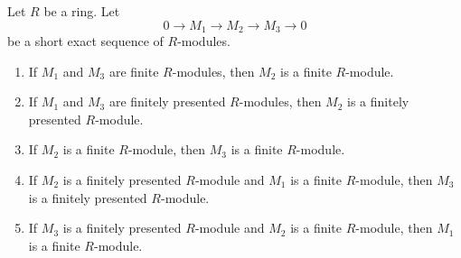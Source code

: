 \begin{lemma}
\label{lemma-extension}
Let $R$ be a ring.
Let
$$
0 \to M_1 \to M_2 \to M_3 \to 0
$$
be a short exact sequence of $R$-modules.
\begin{enumerate}
\item If $M_1$ and $M_3$ are finite $R$-modules, then $M_2$ is a finite
$R$-module.
\item If $M_1$ and $M_3$ are finitely presented $R$-modules, then $M_2$
is a finitely presented $R$-module.
\item If $M_2$ is a finite $R$-module, then $M_3$ is a finite $R$-module.
\item If $M_2$ is a finitely presented $R$-module and $M_1$ is a
finite $R$-module, then $M_3$ is a finitely presented $R$-module.
\item If $M_3$ is a finitely presented $R$-module and $M_2$ is a finite
$R$-module, then $M_1$ is a finite $R$-module.
\end{enumerate}
\end{lemma}

